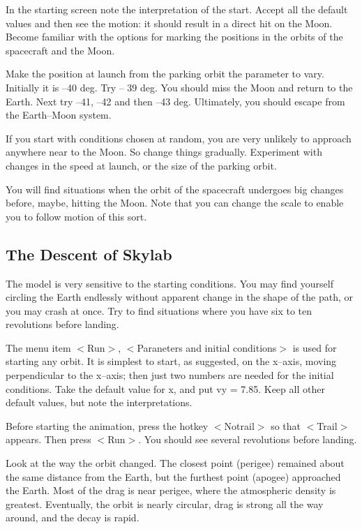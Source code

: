    In the starting screen note the interpretation of the start. Accept
all the default values and then see the motion: it should result in a
direct hit on the Moon. Become familiar with the options  for marking
the positions in the orbits of the spacecraft and the Moon.

   Make the position at launch from the parking orbit the parameter
to vary. Initially it is --40 deg. Try -- 39 deg. You should miss the
Moon and return to the Earth. Next try --41, --42 and then --43 deg.
Ultimately, you should escape from the Earth--Moon system.

   If you start with conditions chosen at random, you are very
unlikely to approach anywhere near to the Moon. So change things
gradually. Experiment with changes in the speed at launch, or the
size of the parking orbit.

   You will find situations when the orbit of the spacecraft undergoes
big changes before, maybe, hitting the Moon. Note that you can
change the scale to enable you to follow motion of this sort.


\subsection{The Descent of Skylab}

   The model is very sensitive to the starting conditions. You may
find yourself circling the Earth endlessly without apparent change
in the shape of the path, or you may crash at once. Try to find
situations where you have six to ten revolutions before landing.

   The menu item $<$Run$>$, $<$Paraneters and initial conditions$>$ is used
for starting any orbit. It is simplest to start, as suggested,
on the x--axis, moving perpendicular to the x--axis; then just two
numbers are needed for the initial conditions. Take the default value
for x, and put vy = 7.85. Keep all other default values, but note the
interpretations.

   Before starting the animation, press the hotkey $<$Notrail$>$ so that
$<$Trail$>$ appears. Then press $<$Run$>$. You should see several revolutions
before landing.

   Look at the way the orbit changed. The closest point (perigee)
remained about the same distance from the Earth, but the furthest
point (apogee) approached the Earth. Most of the drag is near perigee,
where the atmospheric density is greatest. Eventually, the orbit is
nearly circular, drag is strong all the way around, and the decay is rapid.

